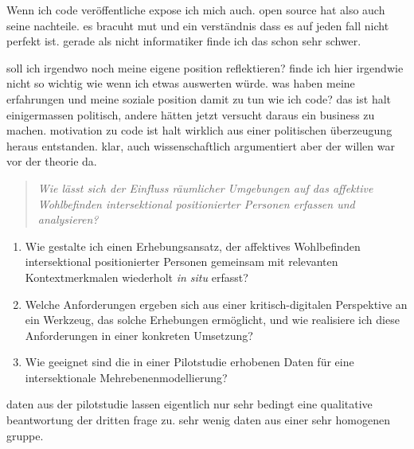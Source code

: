 Wenn ich code veröffentliche expose ich mich auch. open source hat also auch seine nachteile. es bracuht mut und ein verständnis dass es auf jeden fall nicht perfekt ist. gerade als nicht informatiker finde ich das schon sehr schwer.

soll ich irgendwo noch meine eigene position reflektieren? finde ich hier irgendwie nicht so wichtig wie wenn ich etwas auswerten würde. was haben meine erfahrungen und meine soziale position damit zu tun wie ich code? das ist halt einigermassen politisch, andere hätten jetzt versucht daraus ein business zu machen. motivation zu code ist halt wirklich aus einer politischen überzeugung heraus entstanden. klar, auch wissenschaftlich argumentiert aber der willen war vor der theorie da.

\begin{quote}
    \emph{Wie lässt sich der Einfluss räumlicher Umgebungen auf das affektive Wohlbefinden intersektional positionierter Personen erfassen und analysieren?}
\end{quote}

\begin{enumerate}
    \item Wie gestalte ich einen Erhebungsansatz, der affektives Wohlbefinden intersektional positionierter Personen gemeinsam mit relevanten Kontextmerkmalen wiederholt \textit{in situ} erfasst?
    \item Welche Anforderungen ergeben sich aus einer kritisch-digitalen Perspektive an ein Werkzeug, das solche Erhebungen ermöglicht, und wie realisiere ich diese Anforderungen in einer konkreten Umsetzung?
    \item Wie geeignet sind die in einer Pilotstudie erhobenen Daten für eine intersektionale Mehrebenenmodellierung?
\end{enumerate}


daten aus der pilotstudie lassen eigentlich nur sehr bedingt eine qualitative beantwortung der dritten frage zu. sehr wenig daten aus einer sehr homogenen gruppe.

